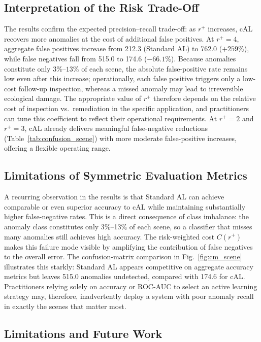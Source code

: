 \documentclass[lettersize,journal]{IEEEtran}
\begin{document}
\subsection{Interpretation of the Risk Trade-Off}

The results confirm the expected precision--recall trade-off: as $r^{+}$
increases, cAL recovers more anomalies at the cost of additional false
positives. At $r^{+}=4$, aggregate false positives increase from 212.3
(Standard AL) to 762.0 ($+259\%$), while false negatives fall from
515.0 to 174.6 ($-66.1\%$). Because anomalies constitute only
$3\%$--$13\%$ of each scene, the absolute false-positive rate remains
low even after this increase; operationally, each false positive
triggers only a low-cost follow-up inspection, whereas a missed
anomaly may lead to irreversible ecological damage. The appropriate value of $r^{+}$ therefore
depends on the relative cost of inspection vs.\ remediation in the
specific application, and practitioners can tune this coefficient to
reflect their operational requirements. At $r^{+}=2$ and $r^{+}=3$,
cAL already delivers meaningful false-negative reductions (Table~\ref{tab:confusion_scene})
with more moderate false-positive increases, offering a flexible
operating range.

\subsection{Limitations of Symmetric Evaluation Metrics}

A recurring observation in the results is that Standard AL can achieve
comparable or even superior accuracy to cAL while maintaining substantially
higher false-negative rates. This is a direct consequence of class
imbalance: the anomaly class constitutes only 3\%--13\% of each scene,
so a classifier that misses many anomalies still achieves high accuracy.
The risk-weighted cost $C(r^{+})$ makes this failure mode visible by
amplifying the contribution of false negatives to the overall error.
The confusion-matrix comparison in Fig.~\ref{fig:cm_scene} illustrates
this starkly: Standard AL appears competitive on aggregate accuracy
metrics but leaves 515.0 anomalies undetected, compared with 174.6 for
cAL. Practitioners relying solely on accuracy or ROC-AUC to select an
active learning strategy may, therefore, inadvertently deploy a system with
poor anomaly recall in exactly the scenes that matter most.

\subsection{Limitations and Future Work}
\end{document}
